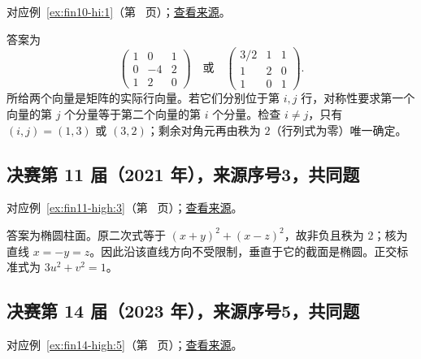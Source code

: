 \documentclass[12pt,fontset=fandol]{ctexart}
\begin{document}
对应例~\ref{ex:fin10-hi:1}（第~\pageref{ex:fin10-hi:1} 页）；\href{https://github.com/lzxcr/cmc-mathematics/blob/64916fa1fdbc3e444a652eca204d5669058ee321/src/problems/finals/10/01.md}{查看来源}。

\begin{solve}

答案为
\[
\begin{pmatrix}1&0&1\\0&-4&2\\1&2&0\end{pmatrix}\quad\text{或}\quad
\begin{pmatrix}3/2&1&1\\1&2&0\\1&0&1\end{pmatrix}.
\]
所给两个向量是矩阵的实际行向量。若它们分别位于第 $i,j$ 行，对称性要求第一个向量的第 $j$ 个分量等于第二个向量的第 $i$ 个分量。检查 $i\ne j$，只有 $(i,j)=(1,3)$ 或 $(3,2)$；剩余对角元再由秩为 $2$（行列式为零）唯一确定。

\end{solve}

\subsection{决赛第 11 届（2021 年），来源序号3，共同题}\label{ans:fin11-high:3}\label{pr:fin11-high:3}

对应例~\ref{ex:fin11-high:3}（第~\pageref{ex:fin11-high:3} 页）；\href{https://github.com/lzxcr/cmc-mathematics/blob/64916fa1fdbc3e444a652eca204d5669058ee321/src/problems/finals/11/03.md}{查看来源}。

\begin{solve}

答案为椭圆柱面。原二次式等于 $(x+y)^2+(x-z)^2$，故非负且秩为 $2$；核为直线 $x=-y=z$。因此沿该直线方向不受限制，垂直于它的截面是椭圆。正交标准式为 $3u^2+v^2=1$。

\end{solve}

\subsection{决赛第 14 届（2023 年），来源序号5，共同题}\label{ans:fin14-high:5}\label{pr:fin14-high:5}

对应例~\ref{ex:fin14-high:5}（第~\pageref{ex:fin14-high:5} 页）；\href{https://github.com/lzxcr/cmc-mathematics/blob/64916fa1fdbc3e444a652eca204d5669058ee321/src/problems/finals/14/05.md}{查看来源}。
\end{document}
